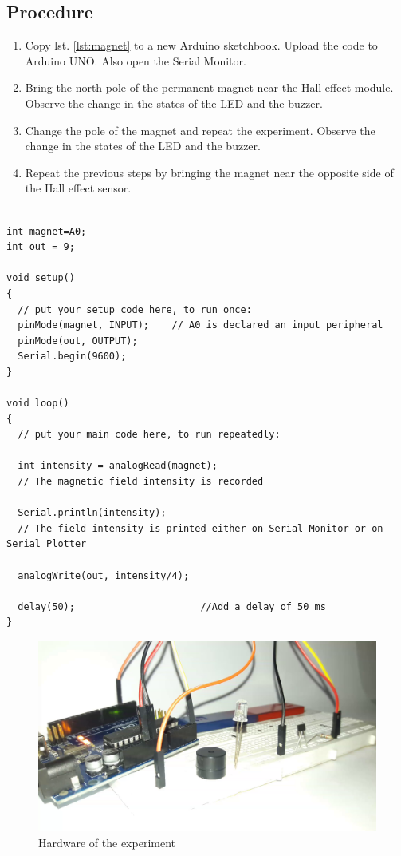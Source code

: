 \subsection*{Procedure}
\begin{enumerate}[leftmargin=*]
    \item Copy lst. \ref{lst:magnet} to a new Arduino sketchbook. Upload the code to Arduino UNO. Also open the Serial Monitor.
    \item Bring the north pole of the permanent magnet near the Hall effect module. Observe the change in the states of the LED and the buzzer.
    \item Change the pole of the magnet and repeat the experiment. Observe the change in the states of the LED and the buzzer.
    \item Repeat the previous steps by bringing the magnet near the opposite side of the Hall effect sensor.
\end{enumerate}
\begin{lstlisting}[language=Arduino, numbers=none, caption={Arduino code for measuring the intensity of light measured by LDR}, captionpos=b, label={lst:magnet}]

int magnet=A0;
int out = 9;

void setup() 
{
  // put your setup code here, to run once:
  pinMode(magnet, INPUT);    // A0 is declared an input peripheral
  pinMode(out, OUTPUT); 
  Serial.begin(9600);
}

void loop() 
{
  // put your main code here, to run repeatedly:
  
  int intensity = analogRead(magnet);    
  // The magnetic field intensity is recorded
  
  Serial.println(intensity);          
  // The field intensity is printed either on Serial Monitor or on Serial Plotter
  
  analogWrite(out, intensity/4);
        
  delay(50);                      //Add a delay of 50 ms
}

\end{lstlisting}

\begin{figure}[H]
    \centering
    \includegraphics[width=0.75\linewidth]{Figures/magnetism-hardware.png}
    \caption{Hardware of the experiment}
    \label{fig:my_label}
\end{figure}
